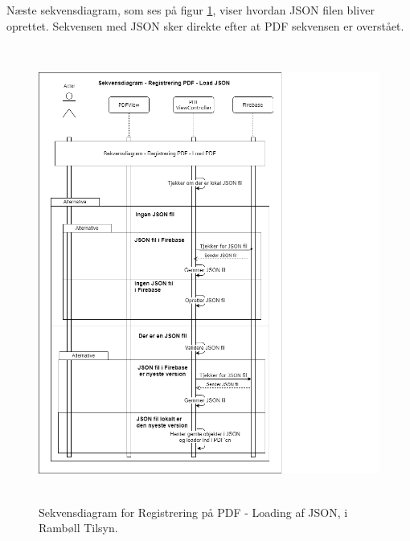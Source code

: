 Næste sekvensdiagram, som ses på figur \ref{fig:LoadJSONSekvensDiagram}, viser hvordan JSON filen bliver oprettet. Sekvensen med JSON sker direkte efter at PDF sekvensen er overstået.
\begin{figure}[H] %
	\centering
	\includegraphics[height=15cm, width=15cm]{../ArkitekturDesign/Design/RegisterPDF/LoadJSONSekvensDiagram}
	\caption{Sekvensdiagram for Registrering på PDF - Loading af JSON, i Rambøll Tilsyn.}
	\label{fig:LoadJSONSekvensDiagram}
\end{figure}

\clearpage

